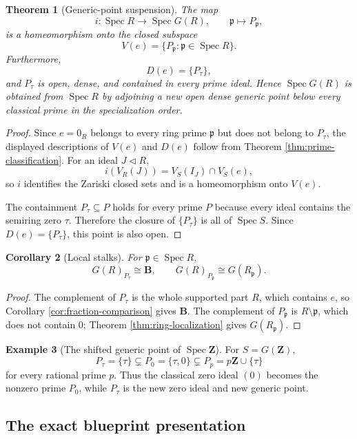 \documentclass[11pt]{amsart}
\numberwithin{equation}{section}
\newtheorem{theorem}{Theorem}[section]
\newtheorem{corollary}[theorem]{Corollary}
\theoremstyle{definition}
\newtheorem{example}[theorem]{Example}
\newcommand{\B}{\mathbf B}
\newcommand{\Z}{\mathbf Z}
\newcommand{\Spec}{\operatorname{Spec}}
\begin{document}
\begin{theorem}[Generic-point suspension]\label{thm:generic-suspension}
The map
\[
i:\Spec R\longrightarrow\Spec G(R),
\qquad
\mathfrak p\longmapsto P_{\mathfrak p},
\]
is a homeomorphism onto the closed subspace
\[
V(e)=\{P_{\mathfrak p}:\mathfrak p\in\Spec R\}.
\]
Furthermore,
\[
D(e)=\{P_\tau\},
\]
and $P_\tau$ is open, dense, and contained in every prime ideal.  Hence $\Spec G(R)$ is obtained from $\Spec R$ by adjoining a new open dense generic point below every classical prime in the specialization order.
\end{theorem}

\begin{proof}
Since $e=0_R$ belongs to every ring prime $\mathfrak p$ but does not belong to $P_\tau$, the displayed descriptions of $V(e)$ and $D(e)$ follow from Theorem \ref{thm:prime-classification}.  For an ideal $J\triangleleft R$,
\[
i(V_R(J))
=
V_S(I_J)\cap V_S(e),
\]
so $i$ identifies the Zariski closed sets and is a homeomorphism onto $V(e)$.

The containment $P_\tau\subseteq P$ holds for every prime $P$ because every ideal contains the semiring zero $\tau$.  Therefore the closure of $\{P_\tau\}$ is all of $\Spec S$.  Since $D(e)=\{P_\tau\}$, this point is also open.
\end{proof}

\begin{corollary}[Local stalks]\label{cor:split-stalks}
For $\mathfrak p\in\Spec R$,
\[
G(R)_{P_\tau}\cong\B,
\qquad
G(R)_{P_{\mathfrak p}}\cong G(R_{\mathfrak p}).
\]
\end{corollary}

\begin{proof}
The complement of $P_\tau$ is the whole supported part $R$, which contains $e$, so Corollary \ref{cor:fraction-comparison} gives $\B$.  The complement of $P_{\mathfrak p}$ is $R\setminus\mathfrak p$, which does not contain $0$; Theorem \ref{thm:ring-localization} gives $G(R_{\mathfrak p})$.
\end{proof}

\begin{example}[The shifted generic point of $\Spec\Z$]
For $S=G(\Z)$,
\[
P_\tau=\{\tau\}
\subsetneq
P_0=\{\tau,0\}
\subsetneq
P_p=p\Z\cup\{\tau\}
\]
for every rational prime $p$.  Thus the classical zero ideal $(0)$ becomes the nonzero prime $P_0$, while $P_\tau$ is the new zero ideal and new generic point.
\end{example}

\subsection{The exact blueprint presentation}
\end{document}

